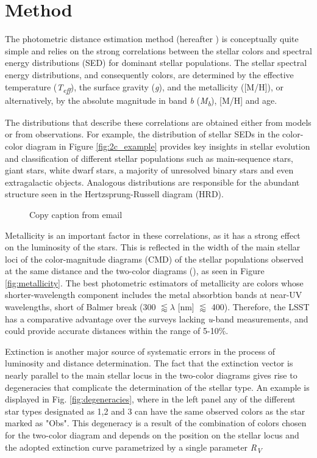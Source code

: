 
\section{Method} \label{sec:method}

The photometric distance estimation method (hereafter \pd) is conceptually quite simple and relies on the strong correlations between the stellar colors and spectral energy distributions (SED) for dominant stellar populations. The stellar spectral energy distributions, and consequently colors, are determined by the effective temperature (\textit{T\textsubscript{eff}}), the surface gravity (\textit{g}), and the metallicity ([M/H]), or alternatively, by the absolute magnitude in band \textit{b} (\textit{M\textsubscript{b}}), [M/H] and age.

The distributions that describe these correlations are obtained either from models or from observations. For example, the distribution of stellar SEDs in the color-color diagram in Figure \ref{fig:2c_example} provides key insights in stellar evolution and classification of different stellar populations such as main-sequence stars, giant stars, white dwarf stars, a majority of unresolved binary stars and even extragalactic objects. Analogous distributions are responsible for the abundant structure seen in the Hertzsprung-Russell diagram (HRD).

\begin{figure*}[ht!]
	\caption{Copy caption from email} \label{fig:3dataDiags}
\end{figure*}

Metallicity is an important factor in these correlations, as it has a strong effect on the luminosity of the stars. This is reflected in the width of the main stellar loci of the color-magnitude diagrams (CMD) of the stellar populations observed at the same distance and the two-color diagrams (), as seen in Figure \ref{fig:metallicity}. The best photometric estimators of metallicity are colors whose shorter-wavelength component includes the metal absorbtion bands at near-UV wavelengths, short of Balmer break (300 $\lessapprox\lambda$ [nm] $\lessapprox$ 400). Therefore, the LSST has a comparative advantage over the surveys lacking \textit{u}-band measurements, and could provide accurate distances within the range of 5-10\%. 

Extinction is another major source of systematic errors in the process of luminosity and distance determination. The fact that the extinction vector is nearly parallel to the main stellar locus in the two-color diagrams gives rise to degeneracies that complicate the determination of the stellar type. An example is displayed in Fig. \ref{fig:degeneracies}, where in the left panel any of the different star types designated as 1,2 and 3 can have the same observed colors as the star marked as "Obs". This degeneracy is a result of the combination of colors chosen for the two-color diagram and depends on the position on the stellar locus and the adopted extinction curve parametrized by a single parameter \textit{R\textsubscript{V}}

